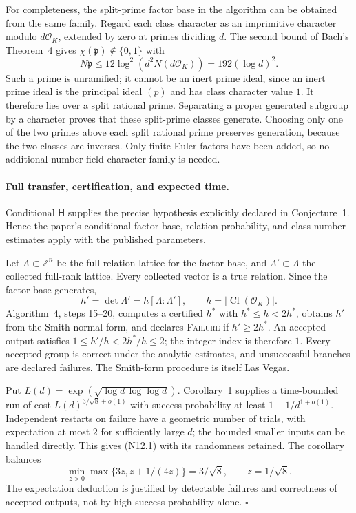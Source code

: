 \documentclass[11pt,a4paper]{article}
\begin{document}
For completeness, the split-prime factor base in the algorithm can be
obtained from the same family. Regard each class character as an
imprimitive character modulo \(d\mathcal O_K\), extended by zero at
primes dividing \(d\). The second bound of Bach's Theorem~4 gives
\(\chi(\mathfrak p)\notin\{0,1\}\) with
\[
 N\mathfrak p\leq12\log^2(d^2N(d\mathcal O_K))
              =192(\log d)^2.
\]
Such a prime is unramified; it cannot be an inert prime ideal, since
an inert prime ideal is the principal ideal \((p)\) and has class
character value \(1\). It therefore lies over a split rational prime.
Separating a proper generated subgroup by a character proves that
these split-prime classes generate. Choosing only one of the two
primes above each split rational prime preserves generation, because
the two classes are inverses. Only finite Euler factors have
been added, so no additional number-field character family is needed.

\paragraph{Full transfer, certification, and expected time.}
Conditional \(\mathsf H\) supplies the precise hypothesis explicitly
declared in Conjecture~1. Hence the paper's conditional factor-base,
relation-probability, and class-number estimates apply with the
published parameters.

Let \(\Lambda\subset\mathbb Z^n\) be the full relation lattice for the
factor base, and \(\Lambda'\subset\Lambda\) the collected full-rank
lattice. Every collected vector is a true relation. Since the factor
base generates,
\[
       h'=\det\Lambda'=h[\Lambda:\Lambda'],\qquad
       h=|\operatorname{Cl}(\mathcal O_K)|.
\]
Algorithm~4, steps 15--20, computes a certified \(h^*\) with
\(h^*\leq h<2h^*\), obtains \(h'\) from the Smith normal form, and
declares \textsc{Failure} if \(h'\geq2h^*\).
An accepted output satisfies \(1\leq h'/h<2h^*/h\leq2\);
the integer index is therefore \(1\). Every accepted group is correct
under the analytic estimates, and unsuccessful branches are declared
failures. The Smith-form procedure is itself Las Vegas.

Put \(L(d)=\exp(\sqrt{\log d\,\log\log d})\).
Corollary~1 supplies a time-bounded run of cost
\(L(d)^{3/\sqrt8+o(1)}\) with success probability at least
\(1-1/d^{1+o(1)}\). Independent restarts on failure have a geometric
number of trials, with expectation at most \(2\) for sufficiently
large \(d\); the bounded smaller inputs can be handled directly.
This gives (N12.1) with its randomness retained. The corollary balances
\[
             \min_{z>0}\max\{3z,z+1/(4z)\}=3/\sqrt8,
             \qquad z=1/\sqrt8.
\]
The expectation deduction is justified by detectable failures and
correctness of accepted outputs, not by high success probability alone.
\(\square\)
\end{document}
